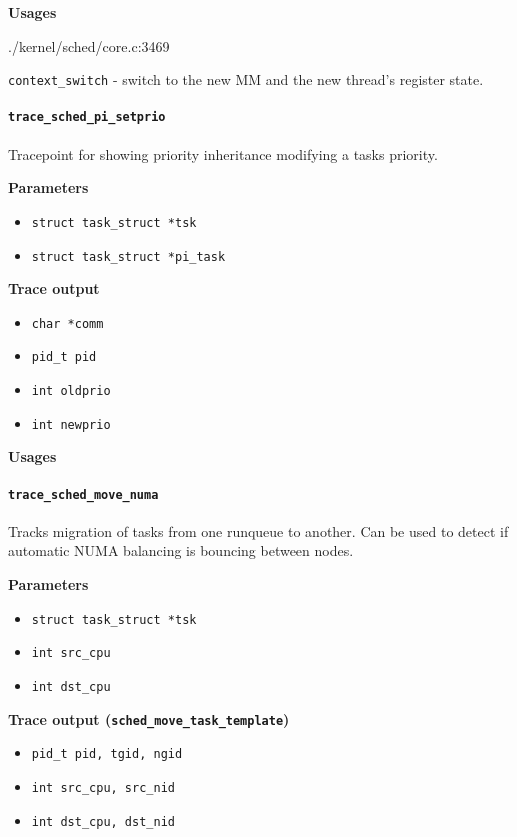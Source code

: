 \textbf{Usages}
\begin{code}
./kernel/sched/core.c:3469
\end{code}
\verb|context_switch| - switch to the new MM and the new thread's register state.
  
\paragraph{\texttt{trace\_sched\_pi\_setprio}}
Tracepoint for showing priority inheritance modifying a tasks priority.

\textbf{Parameters}
\begin{itemize}
    \item \verb|struct task_struct *tsk|
    \item \verb|struct task_struct *pi_task|
\end{itemize}

\textbf{Trace output}
\begin{itemize}
    \item \verb|char *comm|
    \item \verb|pid_t pid|
    \item \verb|int oldprio|
    \item \verb|int newprio|
\end{itemize}

\textbf{Usages}
\begin{code}

\end{code}

\paragraph{\texttt{trace\_sched\_move\_numa}}
Tracks migration of tasks from one runqueue to another. Can be used to detect if automatic NUMA balancing is bouncing between nodes.

\textbf{Parameters}
\begin{itemize}
    \item \verb|struct task_struct *tsk|
    \item \verb|int src_cpu|
    \item \verb|int dst_cpu|
\end{itemize}

\textbf{Trace output (\texttt{sched\_move\_task\_template})}
\begin{itemize}
    \item \verb|pid_t pid, tgid, ngid|
    \item \verb|int src_cpu, src_nid|
    \item \verb|int dst_cpu, dst_nid|
\end{itemize}

